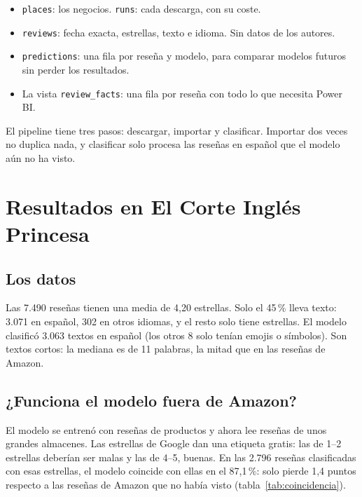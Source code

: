 \documentclass[11pt,a4paper]{article}
\newcommand{\pct}[1]{#1\,\%}
\newcommand{\code}[1]{\texttt{\small #1}}
\begin{document}
\begin{itemize}
  \item \code{places}: los negocios. \code{runs}: cada descarga, con su coste.
  \item \code{reviews}: fecha exacta, estrellas, texto e idioma. Sin datos de los autores.
  \item \code{predictions}: una fila por reseña y modelo, para comparar modelos futuros sin perder los resultados.
  \item La vista \code{review\_facts}: una fila por reseña con todo lo que necesita Power BI.
\end{itemize}

El pipeline tiene tres pasos: descargar, importar y clasificar. Importar dos veces no duplica nada, y clasificar
solo procesa las reseñas en español que el modelo aún no ha visto.

\section{Resultados en El Corte Inglés Princesa}

\subsection{Los datos}

Las 7.490 reseñas tienen una media de 4,20 estrellas. Solo el \pct{45} lleva texto: 3.071 en español, 302 en otros
idiomas, y el resto solo tiene estrellas. El modelo clasificó 3.063 textos en español (los otros 8 solo tenían emojis
o símbolos). Son textos cortos: la mediana es de 11 palabras, la mitad que en las reseñas de Amazon.

\subsection{¿Funciona el modelo fuera de Amazon?}

El modelo se entrenó con reseñas de productos y ahora lee reseñas de unos grandes almacenes. Las estrellas de
Google dan una etiqueta gratis: las de 1--2 estrellas deberían ser malas y las de 4--5, buenas. En las 2.796
reseñas clasificadas con esas estrellas, el modelo coincide con ellas en el \pct{87,1}: solo pierde 1,4 puntos
respecto a las reseñas de Amazon que no había visto (tabla~\ref{tab:coincidencia}).
\end{document}
